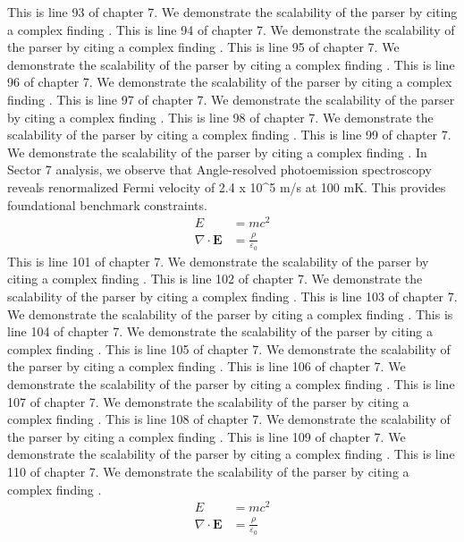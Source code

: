 This is line 93 of chapter 7. We demonstrate the scalability of the parser by citing a complex finding \cite{ref7_93}.
This is line 94 of chapter 7. We demonstrate the scalability of the parser by citing a complex finding \cite{ref7_94}.
This is line 95 of chapter 7. We demonstrate the scalability of the parser by citing a complex finding \cite{ref7_95}.
This is line 96 of chapter 7. We demonstrate the scalability of the parser by citing a complex finding \cite{ref7_96}.
This is line 97 of chapter 7. We demonstrate the scalability of the parser by citing a complex finding \cite{ref7_97}.
This is line 98 of chapter 7. We demonstrate the scalability of the parser by citing a complex finding \cite{ref7_98}.
This is line 99 of chapter 7. We demonstrate the scalability of the parser by citing a complex finding \cite{ref7_99}.
In Sector 7 analysis, we observe that Angle-resolved photoemission spectroscopy reveals renormalized Fermi velocity of 2.4 x 10^5 m/s at 100 mK. This provides foundational benchmark constraints.
\begin{align*}
  E &= mc^2 \\
  \nabla \cdot \mathbf{E} &= \frac{\rho}{\varepsilon_0}
\end{align*}
This is line 101 of chapter 7. We demonstrate the scalability of the parser by citing a complex finding \cite{ref7_101}.
This is line 102 of chapter 7. We demonstrate the scalability of the parser by citing a complex finding \cite{ref7_102}.
This is line 103 of chapter 7. We demonstrate the scalability of the parser by citing a complex finding \cite{ref7_103}.
This is line 104 of chapter 7. We demonstrate the scalability of the parser by citing a complex finding \cite{ref7_104}.
This is line 105 of chapter 7. We demonstrate the scalability of the parser by citing a complex finding \cite{ref7_105}.
This is line 106 of chapter 7. We demonstrate the scalability of the parser by citing a complex finding \cite{ref7_106}.
This is line 107 of chapter 7. We demonstrate the scalability of the parser by citing a complex finding \cite{ref7_107}.
This is line 108 of chapter 7. We demonstrate the scalability of the parser by citing a complex finding \cite{ref7_108}.
This is line 109 of chapter 7. We demonstrate the scalability of the parser by citing a complex finding \cite{ref7_109}.
This is line 110 of chapter 7. We demonstrate the scalability of the parser by citing a complex finding \cite{ref7_110}.
\begin{align*}
  E &= mc^2 \\
  \nabla \cdot \mathbf{E} &= \frac{\rho}{\varepsilon_0}
\end{align*}
